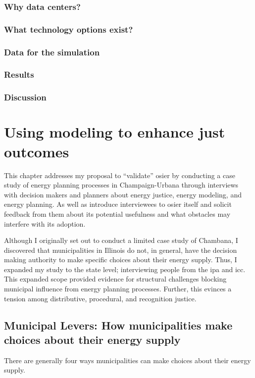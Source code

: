 \subsection{Why data centers?}

\subsection{What technology options exist?}

\subsection{Data for the simulation}

\subsection{Results}

\subsection{Discussion}


\chapter{Using modeling to enhance just outcomes}
\iffalse


This chapter addresses my proposal to ``validate'' \ac{osier} by conducting a
case study of energy planning processes in Champaign-Urbana through interviews
with decision makers and planners about energy justice, energy modeling, and
energy planning. As well as introduce interviewees to \ac{osier} itself and
solicit feedback from them about its potential usefulness and what obstacles may
interfere with its adoption. 

Although I originally set out to conduct a limited case study of Chambana, I
discovered that municipalities in Illinois do not, in general, have the decision
making authority to make specific choices about their energy supply.
Thus, I expanded my study to the state level; interviewing people from the
\ac{ipa} and \ac{icc}. This expanded scope provided evidence for structural
challenges blocking municipal influence from energy planning processes. Further,
this evinces a tension among distributive, procedural, and recognition justice.

\section{Municipal Levers: How municipalities make choices about their energy supply}
There are generally four ways municipalities can make choices about their energy supply.

